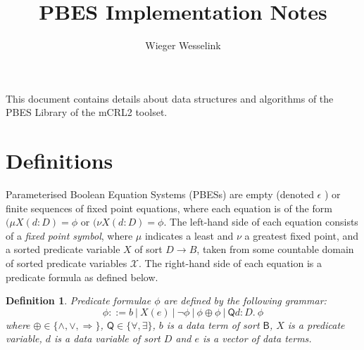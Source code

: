 \documentclass{article}
\newtheorem{definition}[theorem]{Definition}
\begin{document}
\title{PBES Implementation Notes}
\author{Wieger Wesselink}
\maketitle

This document contains details about data structures and algorithms of the
PBES Library of the mCRL2 toolset.

\section{Definitions}

Parameterised Boolean Equation Systems (PBESs) are empty (denoted $\epsilon $%
) or finite sequences of fixed point equations, where each equation is of
the form $(\mu X(d{:}D)=\phi $ or $(\nu X(d{:}D)=\phi $. The left-hand side
of each equation consists of a \emph{fixed point symbol}, where $\mu $
indicates a least and $\nu $ a greatest fixed point, and a sorted predicate
variable $X$ of sort $D\rightarrow B$, taken from some countable domain of
sorted predicate variables $\mathcal{X}$. The right-hand side of each
equation is a predicate formula as defined below.

\begin{definition}
\emph{Predicate formulae} $\phi $ are defined by the following grammar:
\begin{equation*}
\phi ::=b~|~X(e)~|~\lnot \phi ~|~\phi \oplus \phi ~|~\mathsf{Q}d:D.~\phi
\end{equation*}%
where $\oplus \in \{\wedge ,\vee ,\Rightarrow \}$, $\mathsf{Q}\in \{\forall
,\exists \}$, $b$ is a data term of sort $\mathsf{B}$, $X$ is a predicate
variable, $d$ is a data variable of sort $D$ and $e$ is a vector of data
terms.
\end{definition}
\end{document}
